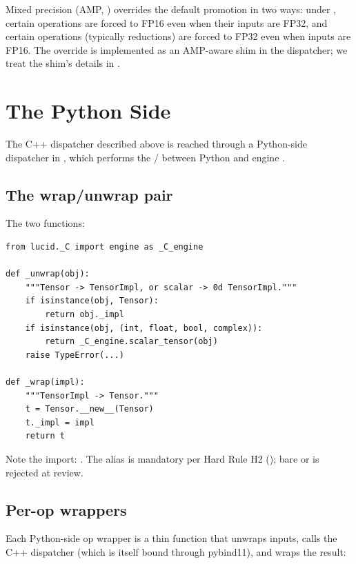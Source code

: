 Mixed precision (AMP, ) overrides the default
promotion in two ways: under , certain operations
are forced to FP16 even when their inputs are FP32, and certain
operations (typically reductions) are forced to FP32 even when
inputs are FP16. The override is implemented as an AMP-aware shim
in the dispatcher; we treat the shim's details in
.

\section{The Python Side}
\label{sec:backend_dispatch:python}

The C++ dispatcher described above is reached through a Python-side
dispatcher in , which performs the
 /  between Python  and
engine .

\subsection{The wrap/unwrap pair}
\label{ssec:backend_dispatch:wrap_unwrap}

The two functions:

\begin{lstlisting}[style=lucid,language=LucidPython]
from lucid._C import engine as _C_engine

def _unwrap(obj):
    """Tensor -> TensorImpl, or scalar -> 0d TensorImpl."""
    if isinstance(obj, Tensor):
        return obj._impl
    if isinstance(obj, (int, float, bool, complex)):
        return _C_engine.scalar_tensor(obj)
    raise TypeError(...)

def _wrap(impl):
    """TensorImpl -> Tensor."""
    t = Tensor.__new__(Tensor)
    t._impl = impl
    return t
\end{lstlisting}

Note the import: .
The alias is mandatory per Hard Rule H2 ();
bare  or  is rejected at review.

\subsection{Per-op wrappers}
\label{ssec:backend_dispatch:py_wrappers}

Each Python-side op wrapper is a thin function that unwraps inputs,
calls the C++ dispatcher (which is itself bound through pybind11),
and wraps the result:

